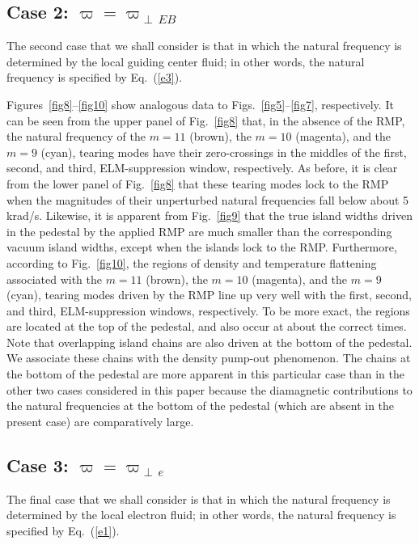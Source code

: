 \documentclass[12pt,prb,aps]{revtex4-1}
\begin{document}
\subsection{Case 2: $\varpi=\varpi_{\perp\,EB}$}
The second case that we shall consider is that in which the natural frequency is determined by the local guiding center fluid; 
in other words, the natural frequency is specified by Eq.~(\ref{e3}). 

Figures~\ref{fig8}--\ref{fig10} show analogous data to Figs.~\ref{fig5}--\ref{fig7}, respectively. It can be seen from the
upper panel of Fig.~\ref{fig8} that, in the absence of the RMP,  the natural frequency of the $m=11$ (brown), the $m=10$ (magenta), and the $m=9$ (cyan), tearing modes have their
zero-crossings in the middles
of the first, second, and third, ELM-suppression window, respectively. As before, it is clear from the lower panel of Fig.~\ref{fig8} that these tearing modes lock
to the RMP when the magnitudes of their unperturbed natural frequencies fall below about 5 krad/s. 
Likewise, it is apparent from Fig.~\ref{fig9} that the true island widths driven in the pedestal by the applied
RMP are much smaller than the corresponding vacuum island widths, except when the islands lock to the RMP.
Furthermore, according to Fig.~\ref{fig10}, the regions of density and temperature flattening associated
with the $m=11$ (brown), the $m=10$ (magenta), and the $m=9$ (cyan), tearing modes driven by the RMP line up
very well with the first, second, and third, ELM-suppression windows, respectively. To be more exact, the regions are located at
the top of the pedestal, and also occur at about the correct times. Note that overlapping island chains
are also driven at the bottom of the pedestal. We associate these chains with the density pump-out phenomenon.\cite{hu,rf2} The chains at the bottom of the pedestal are more apparent
in this particular case than in the other two cases considered in this paper because the diamagnetic contributions to the natural frequencies at the bottom of the pedestal (which are absent
in the present case) are comparatively large. 

\subsection{Case 3: $\varpi=\varpi_{\perp\,e}$}
The final case that we shall consider is that in which the natural frequency is determined by the local electron fluid; 
in other words, the natural frequency is specified by Eq.~(\ref{e1}). 
\end{document}

